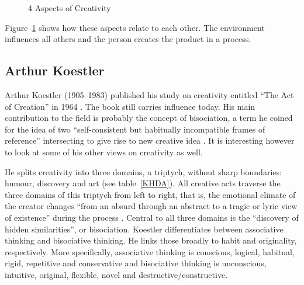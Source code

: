\begin{figure}[htb] %
  \centering
  \tikzset{every fit/.append style=text badly centered}
\caption[4 Aspects of Creativity]{4 Aspects of Creativity}
\label{fig:4Crea}
\end{figure}

\begin{draft}
  Figure~\ref{fig:4Crea} shows how these aspects relate to each other. The environment influences all others and the person creates the product in a process.
\end{draft}


\subsection{Arthur Koestler}

Arthur Koestler (1905--1983) published his study on creativity entitled ``The Act of Creation'' in 1964 \citep{Koestler1964}. The book still carries influence today. His main contribution to the field is probably the concept of \gls{bisociation}, a term he coined for the idea of two ``self-consistent but habitually incompatible frames of reference'' intersecting to give rise to new creative idea \citep[p.35]{Koestler1964}. It is interesting however to look at some of his other views on creativity as well.

He splits creativity into three domains, a triptych, without sharp boundaries: humour, discovery and art (see table~\ref{KHDA}). All creative acts traverse the three domains of this triptych from left to right, that is, the emotional climate of the creator changes ``from an absurd through an abstract to a tragic or lyric view of existence'' during the process \citep[p.27]{Koestler1964}. Central to all three domains is the ``discovery of hidden similarities'', or bisociation. Koestler differentiates between associative thinking and bisociative thinking. He links those broadly to habit and originality, respectively. More specifically, associative thinking is conscious, logical, habitual, rigid, repetitive and conservative and bisociative thinking is unconscious, intuitive, original, flexible, novel and destructive/constructive.

